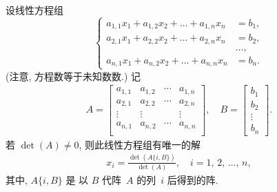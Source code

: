 \documentclass[../libro.tex]{subfiles}
\begin{document}
\begin{theorem}[Cramer 公式, 2]
    设线性方程组
    \begin{equation*}
        \left\{ %
        \begin{aligned}
            a_{1,1} x_1 + a_{1,2} x_2 + \dots + a_{1,n} x_n & = b_1, \\
            a_{2,1} x_1 + a_{2,2} x_2 + \dots + a_{2,n} x_n & = b_2, \\
            & \dots, \\
            a_{n,1} x_1 + a_{n,2} x_2 + \dots + a_{n,n} x_n & = b_n.
        \end{aligned}
        \right. %
    \end{equation*}
    (注意, 方程数等于未知数数.)
    记
    \begin{align*}
        A =
        \begin{bmatrix}
            a_{1,1} & a_{1,2} & \cdots & a_{1,n} \\
            a_{2,1} & a_{2,2} & \cdots & a_{2,n} \\
            \vdots  & \vdots  & {}     & \vdots  \\
            a_{n,1} & a_{n,2} & \cdots & a_{n,n} \\
        \end{bmatrix},
        \quad
        B =
        \begin{bmatrix}
            b_1 \\ b_2 \\ \vdots \\ b_n
        \end{bmatrix}.
    \end{align*}
    若 \(\det {(A)} \neq 0\),
    则此线性方程组有唯一的解
    \begin{align*}
        x_i = \frac{\det {(A \{i, B\})}}{\det {(A)}},
        \quad
        \text{\(i = 1\), \(2\), \(\dots\), \(n\)},
    \end{align*}
    其中, \(A \{i, B\}\) 是%
    以 \(B\) 代阵~\(A\) 的列~\(i\) 后得到的阵.
\end{theorem}
\end{document}
